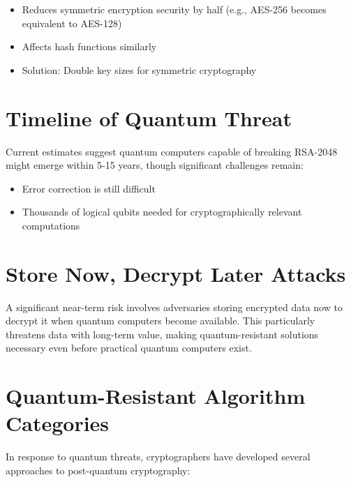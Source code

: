 \begin{itemize}
    \item Reduces symmetric encryption security by half (e.g., AES-256 becomes equivalent to AES-128)
    \item Affects hash functions similarly
    \item Solution: Double key sizes for symmetric cryptography
\end{itemize}

\section{Timeline of Quantum Threat}

Current estimates suggest quantum computers capable of breaking RSA-2048 might emerge within 5-15 years, though significant challenges remain:

\begin{itemize}
    \item Error correction is still difficult
    \item Thousands of logical qubits needed for cryptographically relevant computations
\end{itemize}


\section{Store Now, Decrypt Later Attacks}

A significant near-term risk involves adversaries storing encrypted data now to decrypt it when quantum computers become available. This particularly threatens data with long-term value, making quantum-resistant solutions necessary even before practical quantum computers exist.

\section{Quantum-Resistant Algorithm Categories}
In response to quantum threats, cryptographers have developed several approaches to post-quantum cryptography:

